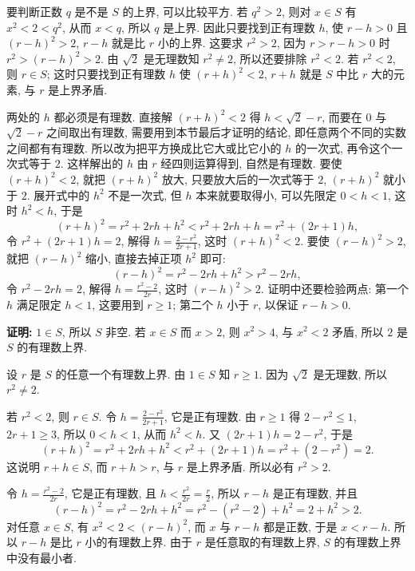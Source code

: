 \documentclass[UTF8,openany]{ctexbook}
\theoremstyle{chinesetextbook}
\newenvironment{cnproof}{\par\indent\textbf{证明:} \ignorespaces}{\par}
\begin{document}
要判断正数 $q$ 是不是 $S$ 的上界, 可以比较平方. 若 $q^2>2$, 则对 $x\in S$ 有 $x^2<2<q^2$, 从而 $x<q$, 所以 $q$ 是上界. 因此只要找到正有理数 $h$, 使 $r-h>0$ 且 $(r-h)^2>2$, $r-h$ 就是比 $r$ 小的上界. 这要求 $r^2>2$, 因为 $r>r-h>0$ 时 $r^2>(r-h)^2>2$. 由 $\sqrt2$ 是无理数知 $r^2\ne2$, 所以还要排除 $r^2<2$. 若 $r^2<2$, 则 $r\in S$; 这时只要找到正有理数 $h$ 使 $(r+h)^2<2$, $r+h$ 就是 $S$ 中比 $r$ 大的元素, 与 $r$ 是上界矛盾.

两处的 $h$ 都必须是有理数. 直接解 $(r+h)^2<2$ 得 $h<\sqrt2-r$, 而要在 $0$ 与 $\sqrt2-r$ 之间取出有理数, 需要用到本节最后才证明的结论, 即任意两个不同的实数之间都有有理数. 所以改为把平方换成比它大或比它小的 $h$ 的一次式, 再令这个一次式等于 $2$. 这样解出的 $h$ 由 $r$ 经四则运算得到, 自然是有理数. 要使 $(r+h)^2<2$, 就把 $(r+h)^2$ 放大, 只要放大后的一次式等于 $2$, $(r+h)^2$ 就小于 $2$. 展开式中的 $h^2$ 不是一次式, 但 $h$ 本来就要取得小, 可以先限定 $0<h<1$, 这时 $h^2<h$, 于是
\[
(r+h)^2=r^2+2rh+h^2<r^2+2rh+h=r^2+(2r+1)h,
\]
令 $r^2+(2r+1)h=2$, 解得 $\displaystyle h=\frac{2-r^2}{2r+1}$, 这时 $(r+h)^2<2$. 要使 $(r-h)^2>2$, 就把 $(r-h)^2$ 缩小, 直接去掉正项 $h^2$ 即可:
\[
(r-h)^2=r^2-2rh+h^2>r^2-2rh,
\]
令 $r^2-2rh=2$, 解得 $\displaystyle h=\frac{r^2-2}{2r}$, 这时 $(r-h)^2>2$. 证明中还要检验两点: 第一个 $h$ 满足限定 $h<1$, 这要用到 $r\ge1$; 第二个 $h$ 小于 $r$, 以保证 $r-h>0$.
\begin{cnproof}
$1\in S$, 所以 $S$ 非空. 若 $x\in S$ 而 $x>2$, 则 $x^2>4$, 与 $x^2<2$ 矛盾, 所以 $2$ 是 $S$ 的有理数上界.

设 $r$ 是 $S$ 的任意一个有理数上界. 由 $1\in S$ 知 $r\ge1$. 因为 $\sqrt2$ 是无理数, 所以 $r^2\ne2$.

若 $r^2<2$, 则 $r\in S$. 令 $\displaystyle h=\frac{2-r^2}{2r+1}$, 它是正有理数. 由 $r\ge1$ 得 $2-r^2\le1$, $2r+1\ge3$, 所以 $0<h<1$, 从而 $h^2<h$. 又 $(2r+1)h=2-r^2$, 于是
\[
(r+h)^2=r^2+2rh+h^2<r^2+(2r+1)h=r^2+(2-r^2)=2.
\]
这说明 $r+h\in S$, 而 $r+h>r$, 与 $r$ 是上界矛盾. 所以必有 $r^2>2$.

令 $\displaystyle h=\frac{r^2-2}{2r}$, 它是正有理数, 且 $\displaystyle h<\frac{r^2}{2r}=\frac r2$, 所以 $r-h$ 是正有理数, 并且
\[
(r-h)^2=r^2-2rh+h^2=r^2-(r^2-2)+h^2=2+h^2>2.
\]
对任意 $x\in S$, 有 $x^2<2<(r-h)^2$, 而 $x$ 与 $r-h$ 都是正数, 于是 $x<r-h$. 所以 $r-h$ 是比 $r$ 小的有理数上界. 由于 $r$ 是任意取的有理数上界, $S$ 的有理数上界中没有最小者.
\end{cnproof}
\end{document}
